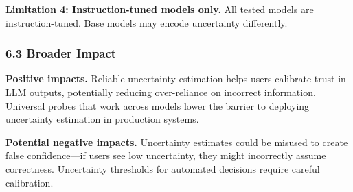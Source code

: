 \textbf{Limitation 4: Instruction-tuned models only.} All tested models are instruction-tuned. Base models may encode uncertainty differently.

\subsubsection{6.3 Broader Impact}

\textbf{Positive impacts.} Reliable uncertainty estimation helps users calibrate trust in LLM outputs, potentially reducing over-reliance on incorrect information. Universal probes that work across models lower the barrier to deploying uncertainty estimation in production systems.

\textbf{Potential negative impacts.} Uncertainty estimates could be misused to create false confidence---if users see low uncertainty, they might incorrectly assume correctness. Uncertainty thresholds for automated decisions require careful calibration.
